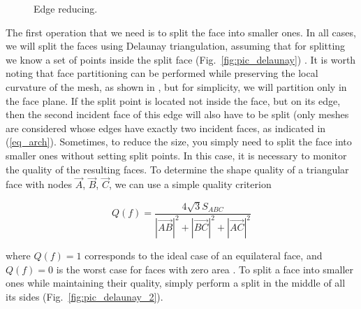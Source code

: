 \documentclass[
11pt,%
tightenlines,%
twoside,%
onecolumn,%
nofloats,%
nobibnotes,%
nofootinbib,%
superscriptaddress,%
noshowpacs,%
centertags]%
{revtex4-2}
\begin{document}
\begin{figure}[h]
\begin{minipage}[h]{0.28\textwidth}
    \caption{Edge reducing.}\label{fig:pic_reduce_edge}
  \end{minipage}
\end{figure}

The first operation that we need is to split the face into smaller ones.
In all cases, we will split the faces using Delaunay triangulation, assuming that for splitting we know a set of points inside the split face (Fig.~\ref{fig:pic_delaunay}) \cite{Rivara}.
It is worth noting that face partitioning can be performed while preserving the local curvature of the mesh, as shown in \cite{Rakotoarivelo}, but for simplicity, we will partition only in the face plane.
If the split point is located not inside the face, but on its edge, then the second incident face of this edge will also have to be split (only meshes are considered whose edges have exactly two incident faces, as indicated in (\ref{eq_arch}).
Sometimes, to reduce the size, you simply need to split the face into smaller ones without setting split points.
In this case, it is necessary to monitor the quality of the resulting faces.
To determine the shape quality of a triangular face with nodes $\vec{A}$, $\vec{B}$, $\vec{C}$, we can use a simple quality criterion

\begin{equation}
Q(f) = \frac{4\sqrt{3} S_{ABC}}{|\vec{AB}|^2 + |\vec{BC}|^2 + |\vec{AC}|^2}
\end{equation}

where $Q(f) = 1$ corresponds to the ideal case of an equilateral face, and $Q(f) = 0$ is the worst case for faces with zero area \cite{Borouchaki}.
To split a face into smaller ones while maintaining their quality, simply perform a split in the middle of all its sides (Fig.~\ref{fig:pic_delaunay_2}).
\end{document}
